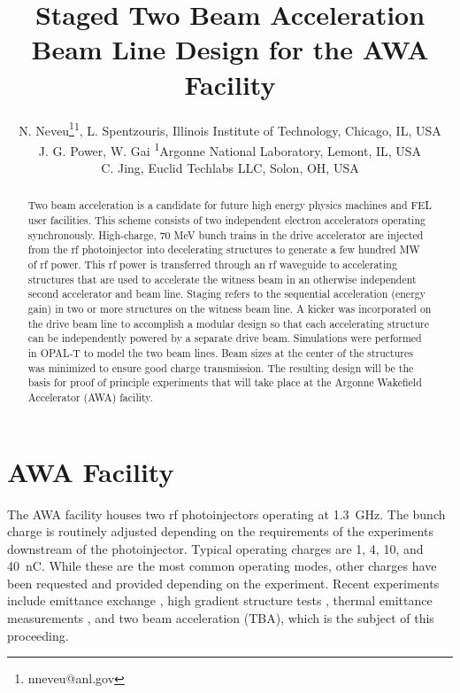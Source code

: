 \documentclass[letterpaper,  %
              ]{jacow-2_3}   %
\begin{document}
\title{Staged Two Beam Acceleration Beam Line Design for the AWA Facility}

\author{N. Neveu\thanks{nneveu@anl.gov}\textsuperscript{1}, 
	    L. Spentzouris, Illinois Institute of Technology, Chicago, IL, USA \\
	    J. G. Power, W. Gai \textsuperscript{1}Argonne National Laboratory, Lemont, IL, USA \\
	    C. Jing, Euclid Techlabs LLC, Solon, OH, USA}
\maketitle

%
\begin{abstract}
Two beam acceleration is a candidate for future high energy physics machines and FEL user facilities. 
This scheme consists of two independent electron accelerators operating synchronously. 
High-charge, 70 MeV bunch trains in the drive accelerator are injected from the rf photoinjector into
decelerating structures to generate a few hundred MW of rf power. 
This rf power is transferred through an rf waveguide to accelerating structures that are used to
accelerate the witness beam in an otherwise independent second accelerator and beam line. 
Staging refers to the sequential acceleration (energy gain) 
in two or more structures on the witness beam line. A kicker was incorporated on the 
drive beam line to accomplish a modular design so that each accelerating structure 
can be independently powered by a separate drive beam. 
Simulations were performed in OPAL-T to model the two beam lines. 
Beam sizes at the center of the structures was minimized to ensure good charge transmission. 
The resulting design will be the basis for proof of principle experiments that will take place 
at the Argonne Wakefield Accelerator (AWA) facility.
\end{abstract}


\section{AWA Facility}
The AWA facility houses two rf photoinjectors
operating at \SI{1.3}{GHz}. 
The bunch charge is routinely adjusted depending on the requirements 
of the experiments downstream of the photoinjector.
Typical operating charges are 1, 4, 10, and \SI{40}{nC}. 
While these are the most
common operating modes, other charges have been requested 
and provided depending on the experiment.
Recent experiments include emittance exchange \cite{eex}, 
high gradient structure tests \cite{pets}, thermal emittance measurements \cite{therm}, 
and two beam acceleration \cite{tba} (TBA), which is the subject of this proceeding. 
\end{document}
